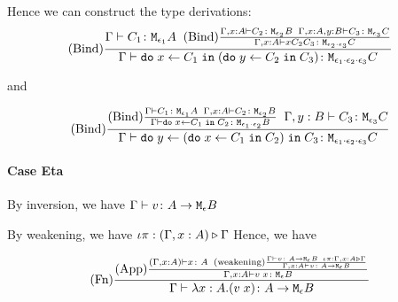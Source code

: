 {        Hence we can construct the type derivations:
        \begin{equation} 
            \treerule{Bind}{
                \gtyperelation{C_1}{\M{\e_1}{A}}
                \s\s
                \treerule{Bind}{
                    \typerelation{\gax}{C_2}{\M{\e_2}{B}}
                    \s\s
                    \typerelation{\gax, y: B}{C_3}{\M{\e_3}{C}}
                }{
                    \typerelation{\gax}{\do{x}{C_2}{C_3}}{\M{\e_2 \dot \e_3}{C}}
                }
            }{
                \gtyperelation{
                    \doin{x}{C_1}{
                        (\doin{y}{C_2}{C_3})
                    }
                }{
                    \M{\e_1\dot\e_2\dot\e_3}{C}
                }
            }
        \end{equation}

        and 

        \begin{equation}
            (\text{Bind}) \frac{
                (\text{Bind}) \frac{
                    \Gamma \vdash C_1 \colon \texttt{M}_{\epsilon_1}{A}
                    \;\;
                    \Gamma, x: A \vdash C_2 \colon \texttt{M}_{\epsilon_2}{B}
                }{
                    \Gamma \vdash \texttt{do}\; x \leftarrow C_1 \;\texttt{in}\; C_2 \colon \texttt{M}_{\epsilon_1\cdot\epsilon_2}{B}
                }
                \;\;
                \Gamma, y: B \vdash C_3 \colon \texttt{M}_{\epsilon_3}{C}
            }{
                \Gamma \vdash \texttt{do}\; y \leftarrow (\texttt{do}\; x \leftarrow C_1 \;\texttt{in}\; C_2) \;\texttt{in}\; C_3 \colon \texttt{M}_{\epsilon_1\cdot\epsilon_2\cdot\epsilon_3}{C}
            }
        \end{equation}

        \paragraph{Case Eta}
        By inversion, we have $\Gamma \vdash v \colon A \rightarrow \texttt{M}_{\epsilon}{B}$

        By weakening, we have $\iota\pi : (\Gamma, x: A) \triangleright \Gamma$
        Hence, we have

        \begin{equation}
            (\text{Fn}) \frac{
                (\text{App}) \frac{
                    (\Gamma, x: A) \vdash x \colon A
                    \;\;
                    (\text{weakening}) \frac{
                        \Gamma \vdash v \colon A \rightarrow \texttt{M}_{\epsilon}{B}
                        \;\;
                        \iota\pi : \Gamma, x: A \triangleright \Gamma
                    }{
                        \Gamma, x: A \vdash v \colon A \rightarrow \texttt{M}_{\epsilon}{B}
                    }
                }{
                    \Gamma, x: A \vdash v\; x \colon \texttt{M}_{\epsilon}{B}
                }
            }{\Gamma \vdash \lambda x : A. (v\; x) \colon A \rightarrow \texttt{M}_{\epsilon}{B}}
        \end{equation}

}

